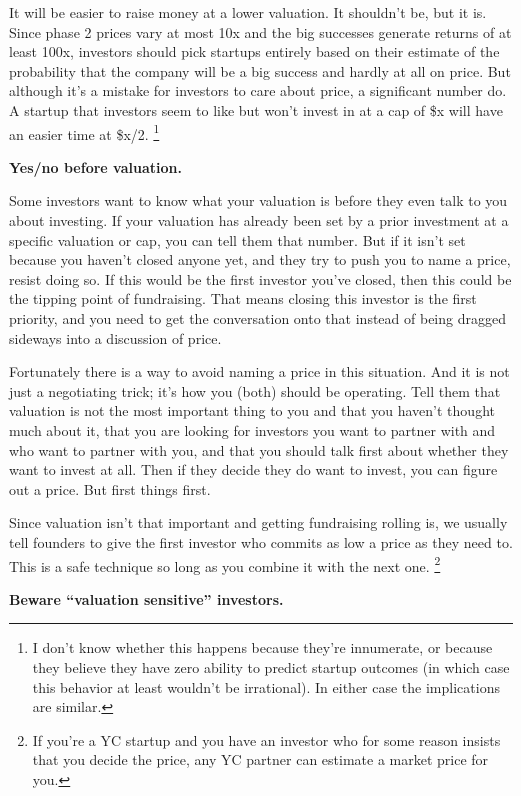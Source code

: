 \documentclass[12pt]{book}
\begin{document}
It will be easier to raise money at a lower valuation. It shouldn't be,
but it is. Since phase 2 prices vary at most 10x and the big successes
generate returns of at least 100x, investors should pick startups
entirely based on their estimate of the probability that the company
will be a big success and hardly at all on price. But although it's a
mistake for investors to care about price, a significant number do. A
startup that investors seem to like but won't invest in at a cap of \$x
will have an easier time at \$x/2. \footnote{I don't know whether this happens because they're innumerate,
or because they believe they have zero ability to predict startup
outcomes (in which case this behavior at least wouldn't be irrational).
In either case the implications are similar.}

\textbf{Yes/no before valuation.}

Some investors want to know what your valuation is before they even talk
to you about investing. If your valuation has already been set by a
prior investment at a specific valuation or cap, you can tell them that
number. But if it isn't set because you haven't closed anyone yet, and
they try to push you to name a price, resist doing so. If this would be
the first investor you've closed, then this could be the tipping point
of fundraising. That means closing this investor is the first priority,
and you need to get the conversation onto that instead of being dragged
sideways into a discussion of price.

Fortunately there is a way to avoid naming a price in this situation.
And it is not just a negotiating trick; it's how you (both) should be
operating. Tell them that valuation is not the most important thing to
you and that you haven't thought much about it, that you are looking for
investors you want to partner with and who want to partner with you, and
that you should talk first about whether they want to invest at all.
Then if they decide they do want to invest, you can figure out a price.
But first things first.

Since valuation isn't that important and getting fundraising rolling is,
we usually tell founders to give the first investor who commits as low a
price as they need to. This is a safe technique so long as you combine
it with the next one. \footnote{If you're a YC startup and you have an investor who for some
reason insists that you decide the price, any YC partner can estimate a
market price for you.}

\textbf{Beware ``valuation sensitive'' investors.}
\end{document}
